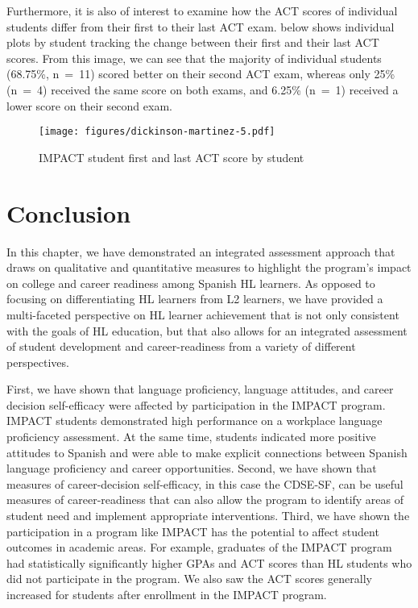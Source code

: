 \documentclass[output=paper]{langscibook}
\begin{document}
Furthermore, it is also of interest to examine how the ACT scores of individual students differ from their first to their last ACT exam.  below shows individual plots by student tracking the change between their first and their last ACT scores. From this image, we can see that the majority of individual students (68.75\%, n~=~11) scored better on their second ACT exam, whereas only 25\% (n~=~4) received the same score on both exams, and 6.25\% (n~=~1) received a lower score on their second exam.

\begin{figure}
\caption{\label{fig:5:5}IMPACT student first and last ACT score by student}
\texttt{[image: figures/dickinson-martinez-5.pdf]}
\end{figure}


\section{Conclusion}

In this chapter, we have demonstrated an integrated assessment approach that draws on qualitative and quantitative measures to highlight the program’s impact on college and career readiness among Spanish HL learners. As opposed to focusing on differentiating HL learners from L2 learners, we have provided a multi-faceted perspective on HL learner achievement that is not only consistent with the goals of HL education, but that also allows for an integrated assessment of student development and career-readiness from a variety of different perspectives.

First, we have shown that language proficiency, language attitudes, and career decision self-efficacy were affected by participation in the IMPACT program. IMPACT students demonstrated high performance on a workplace language proficiency assessment. At the same time, students indicated more positive attitudes to Spanish and were able to make explicit connections between Spanish language proficiency and career opportunities. Second, we have shown that measures of career-decision self-efficacy, in this case the CDSE-SF, can be useful measures of career-readiness that can also allow the program to identify areas of student need and implement appropriate interventions. Third, we have shown the participation in a program like IMPACT has the potential to affect student outcomes in academic areas. For example, graduates of the IMPACT program had statistically significantly higher GPAs and ACT scores than HL students who did not participate in the program. We also saw the ACT scores generally increased for students after enrollment in the IMPACT program.
\end{document}
